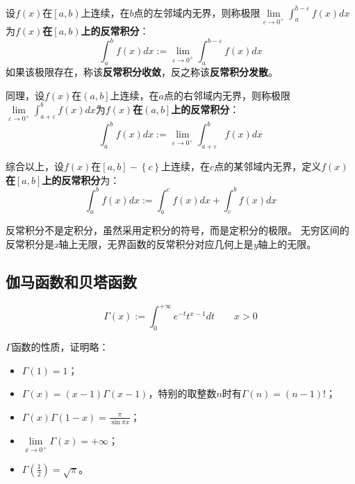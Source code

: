 \begin{definition}[开区间型反常积分]
设$f\left( x \right) $在$\left[ a,b \right) $上连续，在$b$点的左邻域内无界，则称极限$\underset{\varepsilon \rightarrow 0^+}{\lim}\int_a^{b-\varepsilon}{f\left( x \right) dx}$为{\bf $f\left( x \right) $在$\left[ a,b \right) $上的反常积分}：
\[
\int_a^b{f\left( x \right) dx}:=\underset{\varepsilon \rightarrow 0^+}{\lim}\int_a^{b-\varepsilon}{f\left( x \right) dx}
\]
如果该极限存在，称该{\bf 反常积分收敛}，反之称该{\bf 反常积分发散}。

同理，设$f\left( x \right) $在$\left( a,b \right] $上连续，在$a$点的右邻域内无界，则称极限$\underset{\varepsilon \rightarrow 0^+}{\lim}\int_{a+\varepsilon}^b{f\left( x \right) dx}$为{\bf $f\left( x \right) $在$\left( a,b \right] $上的反常积分}：
\[
\int_a^b{f\left( x \right) dx}:=\underset{\varepsilon \rightarrow 0^+}{\lim}\int_{a+\varepsilon}^b{f\left( x \right) dx}
\]

综合以上，设$f\left( x \right) $在$\left[ a,b \right] -\left\{ c \right\} $上连续，在$c$点的某邻域内无界，定义{\bf $f\left( x \right) $在$\left[ a,b \right] $上的反常积分}为：
\[
\int_a^b{f\left( x \right) dx}:=\int_a^c{f\left( x \right) dx}+\int_c^b{f\left( x \right) dx}
\]
\end{definition}

反常积分不是定积分，虽然采用定积分的符号，而是定积分的极限。
无穷区间的反常积分是{\it x}轴上无限，无界函数的反常积分对应几何上是{\it y}轴上的无限。

\subsection{伽马函数和贝塔函数}

\begin{definition}
\[
\Gamma \left( x \right) :=\int_0^{+\infty}{e^{-t}t^{x-1}dt} \qquad x>0
\]
\end{definition}

$\Gamma $函数的性质，证明略：
\begin{itemize}
    \item $\Gamma \left( 1 \right) =1$；
    \item $\Gamma \left( x \right) =\left( x-1 \right) \Gamma \left( x-1 \right) $，特别的取整数$n$时有$\Gamma \left( n \right) =\left( n-1 \right) !$；
    \item $\Gamma \left( x \right) \Gamma \left( 1-x \right) =\frac{\pi}{\sin \pi x}$；
    \item $\underset{x\rightarrow 0^+}{\lim}\Gamma \left( x \right) =+\infty $；
    \item $\Gamma \left( \frac{1}{2} \right) =\sqrt{\pi}$。
\end{itemize}

